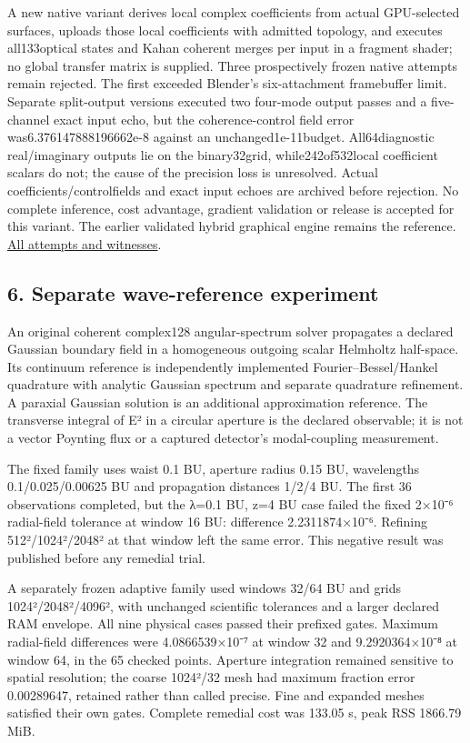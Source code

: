 \documentclass[
  10pt,
]{article}
\begin{document}
A new native variant derives local complex coefficients from actual
GPU-selected surfaces, uploads those local coefficients with admitted
topology, and executes all133optical states and Kahan coherent merges
per input in a fragment shader; no global transfer matrix is supplied.
Three prospectively frozen native attempts remain rejected. The first
exceeded Blender's six-attachment framebuffer limit. Separate
split-output versions executed two four-mode output passes and a
five-channel exact input echo, but the coherence-control field error
was6.376147888196662e-8 against an unchanged1e-11budget. All64diagnostic
real/imaginary outputs lie on the binary32grid, while242of532local
coefficient scalars do not; the cause of the precision loss is
unresolved. Actual coefficients/controlfields and exact input echoes are
archived before rejection. No complete inference, cost advantage,
gradient validation or release is accepted for this variant. The earlier
validated hybrid graphical engine remains the reference.
\href{../NATIVE_RESIDENT_OPTICAL_GRAPH_PROTOCOL_2026-10-09.md}{All
attempts and witnesses}.

\hypertarget{separate-wave-reference-experiment}{%
\subsection{6. Separate wave-reference
experiment}\label{separate-wave-reference-experiment}}

An original coherent complex128 angular-spectrum solver propagates a
declared Gaussian boundary field in a homogeneous outgoing scalar
Helmholtz half-space. Its continuum reference is independently
implemented Fourier--Bessel/Hankel quadrature with analytic Gaussian
spectrum and separate quadrature refinement. A paraxial Gaussian
solution is an additional approximation reference. The transverse
integral of \textbar E\textbar² in a circular aperture is the declared
observable; it is not a vector Poynting flux or a captured detector's
modal-coupling measurement.

The fixed family uses waist 0.1 BU, aperture radius 0.15 BU, wavelengths
0.1/0.025/0.00625 BU and propagation distances 1/2/4 BU. The first 36
observations completed, but the λ=0.1 BU, z=4 BU case failed the fixed
2×10⁻⁶ radial-field tolerance at window 16 BU: difference
2.2311874×10⁻⁶. Refining 512²/1024²/2048² at that window left the same
error. This negative result was published before any remedial trial.

A separately frozen adaptive family used windows 32/64 BU and grids
1024²/2048²/4096², with unchanged scientific tolerances and a larger
declared RAM envelope. All nine physical cases passed their prefixed
gates. Maximum radial-field differences were 4.0866539×10⁻⁷ at window 32
and 9.2920364×10⁻⁸ at window 64, in the 65 checked points. Aperture
integration remained sensitive to spatial resolution; the coarse
1024²/32 mesh had maximum fraction error 0.00289647, retained rather
than called precise. Fine and expanded meshes satisfied their own gates.
Complete remedial cost was 133.05 s, peak RSS 1866.79 MiB.
\end{document}
